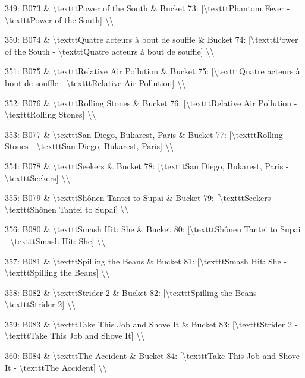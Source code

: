 \documentclass[11pt,a4paper]{article}
\begin{document}
{349: B073 \& \textbackslash{}texttt{Power of the South} \& Bucket 73: [\textbackslash{}texttt{Phantom Fever} - \textbackslash{}texttt{Power of the South}] \textbackslash{}\textbackslash{}

350: B074 \& \textbackslash{}texttt{Quatre acteurs à bout de souffle} \& Bucket 74: [\textbackslash{}texttt{Power of the South} - \textbackslash{}texttt{Quatre acteurs à bout de souffle}] \textbackslash{}\textbackslash{}

351: B075 \& \textbackslash{}texttt{Relative Air Pollution} \& Bucket 75: [\textbackslash{}texttt{Quatre acteurs à bout de souffle} - \textbackslash{}texttt{Relative Air Pollution}] \textbackslash{}\textbackslash{}

352: B076 \& \textbackslash{}texttt{Rolling Stones} \& Bucket 76: [\textbackslash{}texttt{Relative Air Pollution} - \textbackslash{}texttt{Rolling Stones}] \textbackslash{}\textbackslash{}

353: B077 \& \textbackslash{}texttt{San Diego, Bukarest, Paris} \& Bucket 77: [\textbackslash{}texttt{Rolling Stones} - \textbackslash{}texttt{San Diego, Bukarest, Paris}] \textbackslash{}\textbackslash{}

354: B078 \& \textbackslash{}texttt{Seekers} \& Bucket 78: [\textbackslash{}texttt{San Diego, Bukarest, Paris} - \textbackslash{}texttt{Seekers}] \textbackslash{}\textbackslash{}

355: B079 \& \textbackslash{}texttt{Shônen Tantei to Supai} \& Bucket 79: [\textbackslash{}texttt{Seekers} - \textbackslash{}texttt{Shônen Tantei to Supai}] \textbackslash{}\textbackslash{}

356: B080 \& \textbackslash{}texttt{Smash Hit: She} \& Bucket 80: [\textbackslash{}texttt{Shônen Tantei to Supai} - \textbackslash{}texttt{Smash Hit: She}] \textbackslash{}\textbackslash{}

357: B081 \& \textbackslash{}texttt{Spilling the Beans} \& Bucket 81: [\textbackslash{}texttt{Smash Hit: She} - \textbackslash{}texttt{Spilling the Beans}] \textbackslash{}\textbackslash{}

358: B082 \& \textbackslash{}texttt{Strider 2} \& Bucket 82: [\textbackslash{}texttt{Spilling the Beans} - \textbackslash{}texttt{Strider 2}] \textbackslash{}\textbackslash{}

359: B083 \& \textbackslash{}texttt{Take This Job and Shove It} \& Bucket 83: [\textbackslash{}texttt{Strider 2} - \textbackslash{}texttt{Take This Job and Shove It}] \textbackslash{}\textbackslash{}

360: B084 \& \textbackslash{}texttt{The Accident} \& Bucket 84: [\textbackslash{}texttt{Take This Job and Shove It} - \textbackslash{}texttt{The Accident}] \textbackslash{}\textbackslash{}

}
\end{document}

